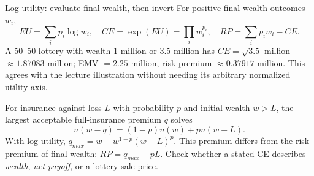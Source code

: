 \documentclass[10pt,a4paper]{article}
\begin{document}
\begin{card}{Log utility: evaluate final wealth, then invert}
For positive final wealth outcomes $w_i$,
\[
EU=\sum_ip_i\log w_i,\quad CE=\exp(EU)=\prod_iw_i^{p_i},\quad RP=\sum_ip_iw_i-CE.
\]
A 50--50 lottery with wealth 1 million or 3.5 million has $CE=\sqrt{3.5}$ million $\approx1.87083$ million; EMV $=2.25$ million, risk premium $\approx0.37917$ million. This agrees with the lecture illustration without needing its arbitrary normalized utility axis.

For insurance against loss $L$ with probability $p$ and initial wealth $w>L$, the largest acceptable full-insurance premium $q$ solves
\[
u(w-q)=(1-p)u(w)+pu(w-L).
\]
With log utility, $q_{max}=w-w^{1-p}(w-L)^p$. This premium differs from the risk premium of final wealth: $RP=q_{max}-pL$. Check whether a stated CE describes \emph{wealth}, \emph{net payoff}, or a lottery sale price.
\end{card}
\end{document}
